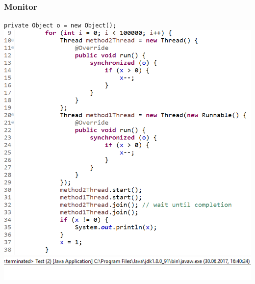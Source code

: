 \documentclass[18pt]{beamer}
\begin{document}
	\begin{frame}
		\frametitle{Monitor}
		\texttt{private Object o = new Object();}
		\includegraphics[scale=0.36]{./pics/tut5/synch-ex3.png} \pause
		\includegraphics[scale=0.39]{./pics/tut5/synch-ex4.png}
	\end{frame}
\end{document}
